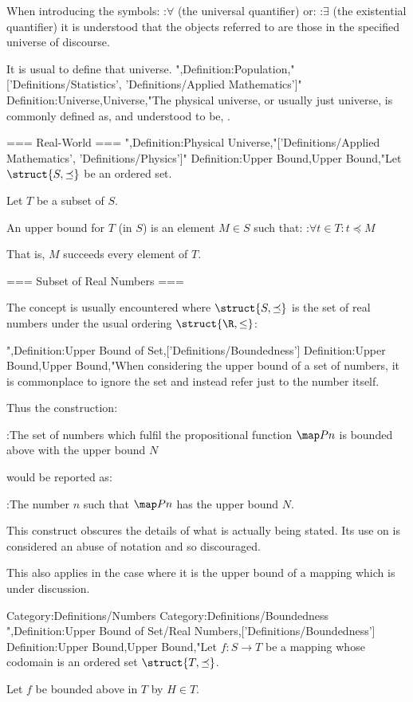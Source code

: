When introducing the symbols:
:$\forall$ (the universal quantifier)
or:
:$\exists$ (the existential quantifier)
it is understood that the objects referred to are those in the specified universe of discourse.

It is usual to define that universe.
",Definition:Population,"['Definitions/Statistics', 'Definitions/Applied Mathematics']"
Definition:Universe,Universe,"The physical universe, or usually just universe, is commonly defined as, and understood to be, .


=== Real-World ===
",Definition:Physical Universe,"['Definitions/Applied Mathematics', 'Definitions/Physics']"
Definition:Upper Bound,Upper Bound,"Let $\struct {S, \preceq}$ be an ordered set.

Let $T$ be a subset of $S$.


An upper bound for $T$ (in $S$) is an element $M \in S$ such that:
:$\forall t \in T: t \preceq M$

That is, $M$ succeeds every element of $T$.


=== Subset of Real Numbers ===

The concept is usually encountered where $\struct {S, \preceq}$ is the set of real numbers under the usual ordering $\struct {\R, \le}$:

",Definition:Upper Bound of Set,['Definitions/Boundedness']
Definition:Upper Bound,Upper Bound,"When considering the upper bound of a set of numbers, it is commonplace to ignore the set and instead refer just to the number itself.

Thus the construction:

:The set of numbers which fulfil the propositional function $\map P n$ is bounded above with the upper bound $N$

would be reported as:

:The number $n$ such that $\map P n$ has the upper bound $N$.


This construct obscures the details of what is actually being stated. Its use on  is considered an abuse of notation and so discouraged.


This also applies in the case where it is the upper bound of a mapping which is under discussion.


Category:Definitions/Numbers
Category:Definitions/Boundedness
",Definition:Upper Bound of Set/Real Numbers,['Definitions/Boundedness']
Definition:Upper Bound,Upper Bound,"Let $f: S \to T$ be a mapping whose codomain is an ordered set $\struct {T, \preceq}$.


Let $f$ be bounded above in $T$ by $H \in T$.


